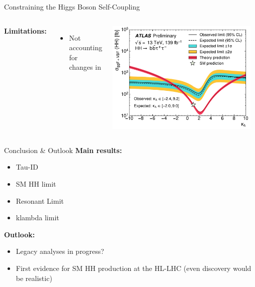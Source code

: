 \documentclass[11pt, xcolor={dvipsnames}, aspectratio=169]{beamer}
\begin{document}
\begin{frame}{Constraining the Higgs Boson Self-Coupling}

  \begin{columns}[onlytextwidth]

    \textbf{Limitations:}
    \begin{itemize}
    \item Not accounting for changes in
    \end{itemize}

     \centering

    \includegraphics[width=0.95\textwidth]{self_coupling/klam_scan_result}
  \end{columns}

\end{frame}


\begin{frame}{Conclusion \& Outlook}
  \textbf{Main results:}
  \begin{itemize}
  \item Tau-ID
  \item SM HH limit
  \item Resonant Limit
  \item klambda limit
  \end{itemize}

  \textbf{Outlook:}
  \begin{itemize}
  \item Legacy analyses in progress?
  \item First evidence for SM HH production at the HL-LHC (even discovery would
    be realistic)
  \end{itemize}
\end{frame}
\end{document}
